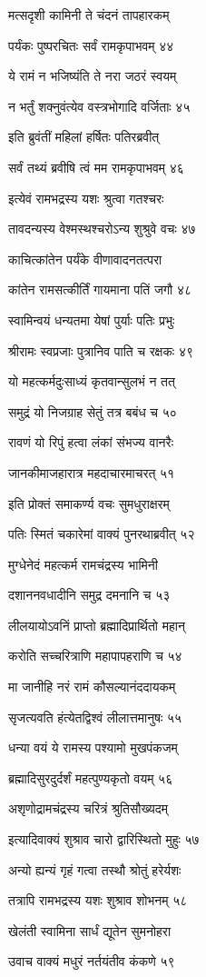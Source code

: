 मत्सदृशी कामिनी ते चंदनं तापहारकम्

पर्यंकः पुष्परचितः सर्वं रामकृपाभवम् ४४

ये रामं न भजिष्यंति ते नरा जठरं स्वयम्

न भर्तुं शक्नुवंत्येव वस्त्रभोगादि वर्जिताः ४५

इति ब्रुवंतीं महिलां हर्षितः पतिरब्रवीत्

सर्वं तथ्यं ब्रवीषि त्वं मम रामकृपाभवम् ४६

इत्येवं रामभद्रस्य यशः श्रुत्वा गतश्चरः

तावदन्यस्य वेश्मस्थश्चरोऽन्य शुश्रुवे वचः ४७

काचित्कांतेन पर्यंके वीणावादनतत्परा

कांतेन रामसत्कीर्तिं गायमाना पतिं जगौ ४८

स्वामिन्वयं धन्यतमा येषां पुर्याः पतिः प्रभुः

श्रीरामः स्वप्रजाः पुत्रानिव पाति च रक्षकः ४९

यो महत्कर्मदुःसाध्यं कृतवान्सुलभं न तत्

समुद्रं यो निजग्राह सेतुं तत्र बबंध च ५०

रावणं यो रिपुं हत्वा लंकां संभज्य वानरैः

जानकीमाजहारात्र महदाचारमाचरत् ५१

इति प्रोक्तं समाकर्ण्य वचः सुमधुराक्षरम्

पतिः स्मितं चकारेमां वाक्यं पुनरथाब्रवीत् ५२

मुग्धेनेदं महत्कर्म रामचंद्रस्य भामिनी

दशाननवधादीनि समुद्र दमनानि च ५३

लीलयायोऽवनिं प्राप्तो ब्रह्मादिप्रार्थितो महान्

करोति सच्चरित्राणि महापापहराणि च ५४

मा जानीहि नरं रामं कौसल्यानंददायकम्

सृजत्यवति हंत्येतद्विश्वं लीलात्तमानुषः ५५

धन्या वयं ये रामस्य पश्यामो मुखपंकजम्

ब्रह्मादिसुरदुर्दर्शं महत्पुण्यकृतो वयम् ५६

अशृणोद्रामचंद्रस्य चरित्रं श्रुतिसौख्यदम्

इत्यादिवाक्यं शुश्राव चारो द्वारिस्थितो मुहुः ५७

अन्यो ह्यन्यं गृहं गत्वा तस्थौ श्रोतुं हरेर्यशः

तत्रापि रामभद्रस्य यशः शुश्राव शोभनम् ५८

खेलंती स्वामिना सार्धं द्यूतेन सुमनोहरा

उवाच वाक्यं मधुरं नर्तयंतीव कंकणे ५९

